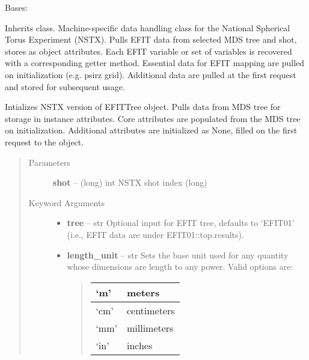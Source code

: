 \documentclass[letterpaper,10pt,english]{sphinxmanual}
\begin{document}
\begin{fulllineitems}
\label{eqtools:eqtools.NSTXEFIT.NSTXEFITTree}
Bases: {\hyperref[eqtools:eqtools.EFIT.EFITTree]{}}

Inherits  class. Machine-specific data
handling class for the National Spherical Torus Experiment (NSTX). Pulls EFIT
data from selected MDS tree and shot, stores as object attributes. Each EFIT
variable or set of variables is recovered with a corresponding getter method.
Essential data for EFIT mapping are pulled on initialization (e.g. psirz grid).
Additional data are pulled at the first request and stored for subsequent usage.

Intializes NSTX version of EFITTree object.  Pulls data from MDS tree for storage
in instance attributes.  Core attributes are populated from the MDS tree on initialization.
Additional attributes are initialized as None, filled on the first request to the object.
\begin{quote}\begin{description}
\item[{Parameters }] \leavevmode
\textbf{shot} --
(long) int
NSTX shot index (long)

\item[{Keyword Arguments}] \leavevmode\begin{itemize}
\item {} 
\textbf{tree} --
str
Optional input for EFIT tree, defaults to `EFIT01'
(i.e., EFIT data are under EFIT01::top.results).

\item {} 
\textbf{length\_unit} --
str
Sets the base unit used for any quantity whose
dimensions are length to any power. Valid options are:
\begin{quote}

\begin{tabulary}{\linewidth}{|L|L|}
\hline

`m'
 & 
meters
\\\hline

`cm'
 & 
centimeters
\\\hline

`mm'
 & 
millimeters
\\\hline

`in'
 & 
inches
\\\hline


\end{tabulary}
\end{quote}
\end{itemize}
\end{description}
\end{quote}
\end{fulllineitems}
\end{document}

